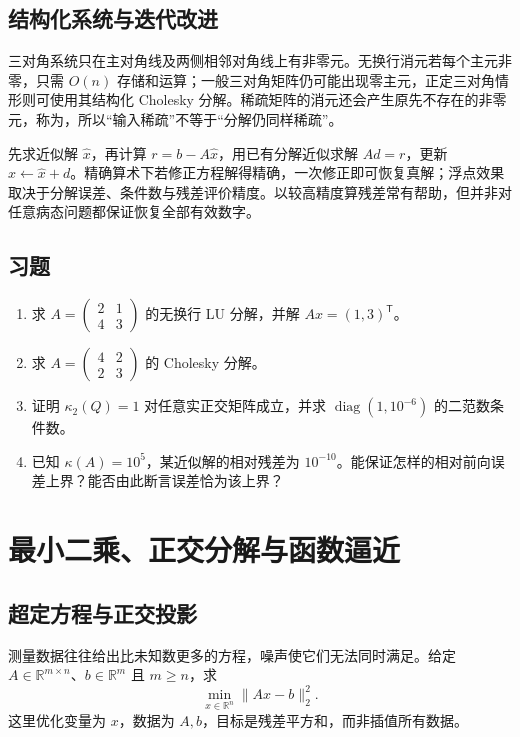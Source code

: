 \documentclass[UTF8,12pt,a4paper,fontset=fandol]{ctexbook}
\begin{document}
\section{结构化系统与迭代改进}
三对角系统只在主对角线及两侧相邻对角线上有非零元。无换行消元若每个主元非零，只需 $O(n)$ 存储和运算；一般三对角矩阵仍可能出现零主元，正定三对角情形则可使用其结构化 Cholesky 分解。稀疏矩阵的消元还会产生原先不存在的非零元，称为，所以“输入稀疏”不等于“分解仍同样稀疏”。

先求近似解 $\widehat x$，再计算 $r=b-A\widehat x$，用已有分解近似求解 $Ad=r$，更新 $\widehat x\leftarrow\widehat x+d$。精确算术下若修正方程解得精确，一次修正即可恢复真解；浮点效果取决于分解误差、条件数与残差评价精度。以较高精度算残差常有帮助，但并非对任意病态问题都保证恢复全部有效数字。

\section{习题}
\begin{enumerate}[label=\arabic*.]
\item\label{exr:na-direct-lu} 求 $A=\begin{pmatrix}2&1\\4&3\end{pmatrix}$ 的无换行 LU 分解，并解 $Ax=(1,3)^{\mathsf T}$。
\item\label{exr:na-direct-cholesky} 求 $A=\begin{pmatrix}4&2\\2&3\end{pmatrix}$ 的 Cholesky 分解。
\item\label{exr:na-direct-condition} 证明 $\kappa_2(Q)=1$ 对任意实正交矩阵成立，并求 $\operatorname{diag}(1,10^{-6})$ 的二范数条件数。
\item\label{exr:na-direct-residual} 已知 $\kappa(A)=10^5$，某近似解的相对残差为 $10^{-10}$。能保证怎样的相对前向误差上界？能否由此断言误差恰为该上界？
\end{enumerate}

\chapter{最小二乘、正交分解与函数逼近}
\label{chap:na-ls}

\section{超定方程与正交投影}
测量数据往往给出比未知数更多的方程，噪声使它们无法同时满足。给定 $A\in\mathbb R^{m\times n}$、$b\in\mathbb R^m$ 且 $m\ge n$，求
\begin{equation}
 \min_{x\in\mathbb R^n}\|Ax-b\|_2^2.
 \label{eq:na-ls-objective}
\end{equation}
这里优化变量为 $x$，数据为 $A,b$，目标是残差平方和，而非插值所有数据。
\end{document}
